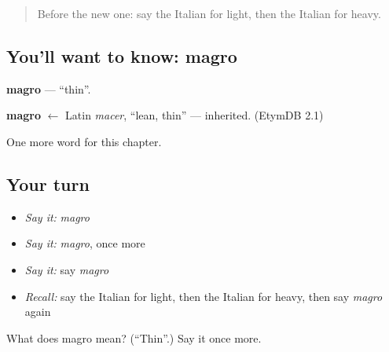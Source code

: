 \begin{quote}
Before the new one: say the Italian for light, then the Italian for heavy.
\end{quote}

\subsection*{You'll want to know: magro}
\textbf{magro} — \textquotedblleft{}thin\textquotedblright{}.

\begin{cousinweb}
\textbf{magro} $\leftarrow$ Latin \emph{macer}, \textquotedblleft{}lean, thin\textquotedblright{} — inherited. (EtymDB 2.1)
\end{cousinweb}

\begin{grammarlens}[title={What you've built}]
One more word for this chapter.
\end{grammarlens}

\subsection*{Your turn}
\begin{itemize}
\raggedright
  \item \emph{Say it:} \emph{magro}
  \item \emph{Say it:} \emph{magro}, once more
  \item \emph{Say it:} say \emph{magro}
  \item \emph{Recall:} say the Italian for light, then the Italian for heavy, then say \emph{magro} again
\end{itemize}

\begin{tcolorbox}[breakable,colback=teal!4,colframe=teal!35!black,title={Before you move on}]
What does magro mean? (\textquotedblleft{}Thin\textquotedblright{}.) Say it once more.
\end{tcolorbox}
